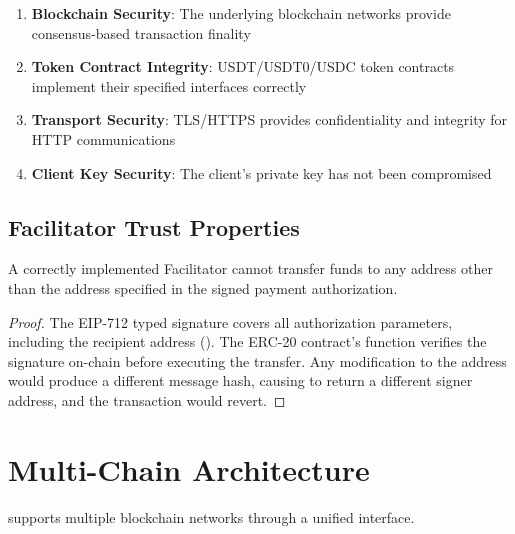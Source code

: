 \begin{enumerate}
    \item \textbf{Blockchain Security}: The underlying blockchain networks provide consensus-based transaction finality

    \item \textbf{Token Contract Integrity}: USDT/USDT0/USDC token contracts implement their specified interfaces correctly

    \item \textbf{Transport Security}: TLS/HTTPS provides confidentiality and integrity for HTTP communications

    \item \textbf{Client Key Security}: The client's private key has not been compromised
\end{enumerate}

\subsection{Facilitator Trust Properties}

\begin{theorem}
A correctly implemented Facilitator cannot transfer funds to any address other than the  address specified in the signed payment authorization.
\end{theorem}

\begin{proof}
The EIP-712 typed signature covers all authorization parameters, including the recipient address (). The ERC-20 contract's  function verifies the signature on-chain before executing the transfer. Any modification to the  address would produce a different message hash, causing  to return a different signer address, and the transaction would revert.
\end{proof}

\section{Multi-Chain Architecture}
\label{sec:multichain}

\tprotocol{} supports multiple blockchain networks through a unified interface.

